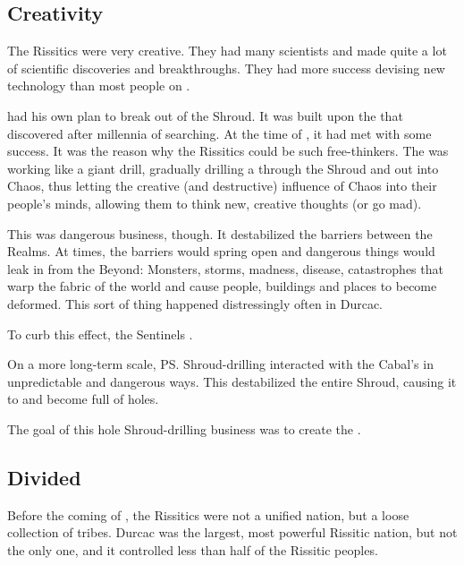 \subsection{Creativity}
The Rissitics were very creative. 
They had many scientists and made quite a lot of scientific discoveries and breakthroughs. 
They had more success devising new technology than most people on \Miith{} . 

\Secherdamon{} had his own plan to break out of the Shroud. 
It was built upon the  that \Secherdamon{} discovered after millennia of searching. 
At the time of , it had met with some success. 
It was the reason why the Rissitics could be such free-thinkers. 
The  was working like a giant drill, gradually drilling a  through the Shroud and out into Chaos, thus letting the creative (and destructive) influence of Chaos into their people's minds, allowing them to think new, creative thoughts (or go mad). 

This  was dangerous business, though. 
It destabilized the barriers between the Realms. 
At times, the barriers would spring open and dangerous things would leak in from the Beyond: 
Monsters, storms, madness, disease, catastrophes that warp the fabric of the world and cause people, buildings and places to become deformed. 
This sort of thing happened distressingly often in Durcac. 

To curb this effect, the Sentinels . 

On a more long-term scale, \ps{\Secherdamon} Shroud-drilling interacted with the Cabal's  in unpredictable and dangerous ways. 
This destabilized the entire Shroud, causing it to  and become full of holes. 

%
The goal of this hole Shroud-drilling business was to create the . 





\subsection{Divided}
Before the coming of , the Rissitics were not a unified nation, but a loose collection of tribes.
Durcac was the largest, most powerful Rissitic nation, but not the only one, and it controlled less than half of the Rissitic peoples.

